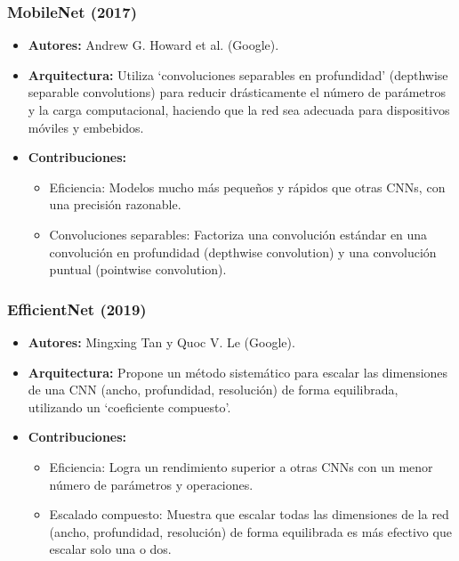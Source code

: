 \documentclass{article}
\begin{document}
\subsubsection{MobileNet (2017)}
\begin{itemize}
\item \textbf{Autores:} Andrew G. Howard et al. (Google).
\item \textbf{Arquitectura:} Utiliza `convoluciones separables en profundidad' (depthwise separable convolutions) para reducir drásticamente el número de parámetros y la carga computacional, haciendo que la red sea adecuada para dispositivos móviles y embebidos.
\item \textbf{Contribuciones:}
    \begin{itemize}
        \item Eficiencia: Modelos mucho más pequeños y rápidos que otras CNNs, con una precisión razonable.
        \item Convoluciones separables: Factoriza una convolución estándar en una convolución en profundidad (depthwise convolution) y una convolución puntual (pointwise convolution).
    \end{itemize}
\end{itemize}

\subsubsection{EfficientNet (2019)}
\begin{itemize}
\item \textbf{Autores:} Mingxing Tan y Quoc V. Le (Google).
\item \textbf{Arquitectura:} Propone un método sistemático para escalar las dimensiones de una CNN (ancho, profundidad, resolución) de forma equilibrada, utilizando un `coeficiente compuesto'.
\item \textbf{Contribuciones:}
\begin{itemize}
    \item Eficiencia: Logra un rendimiento superior a otras CNNs con un menor número de parámetros y operaciones.
    \item Escalado compuesto: Muestra que escalar todas las dimensiones de la red (ancho, profundidad, resolución) de forma equilibrada es más efectivo que escalar solo una o dos.
\end{itemize}
\end{itemize}
\end{document}

